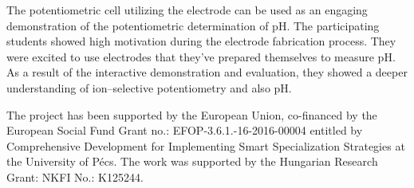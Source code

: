 \documentclass[manuscript=article, journal=jceda8]{achemso}
\begin{document}
The potentiometric cell utilizing the electrode can be used as an engaging demonstration of the potentiometric determination of pH. The participating students showed high motivation during the electrode fabrication process. They were excited to use electrodes that they've prepared themselves to measure pH. As a result of the interactive demonstration and evaluation, they showed a deeper understanding of ion--selective potentiometry and also pH.




\begin{acknowledgement}
The project has been supported by the European Union, co-financed by the European Social Fund Grant no.: EFOP-3.6.1.-16-2016-00004 entitled by Comprehensive Development for Implementing Smart Specialization Strategies at the University of Pécs. The work was supported by the Hungarian Research Grant: NKFI No.: K125244.
\end{acknowledgement}


\end{document}
